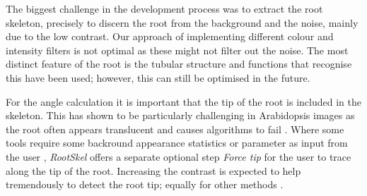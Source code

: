 The biggest challenge in the development process was to extract the root skeleton, precisely to discern the root from the background and the noise, mainly due to the low contrast. %
Our approach of implementing different colour and intensity filters is not optimal as these might not filter out the noise. 
The most distinct feature of the root is the tubular structure and functions that recognise this have been used; however, this can still be optimised in the future. 


For the angle calculation it is important that the tip of the root is included in the skeleton. This has shown to be particularly challenging in Arabidopsis images as the root often appears translucent \cite{french2009high} and causes algorithms to fail \cite{french2009high}. Where some tools require some backround appearance statistics or parameter as input from the user \cite{french2009high}, \textit{RootSkel} offers a separate optional step \textit{Force tip} for the user to trace along the tip of the root. Increasing the contrast is expected to help tremendously to detect the root tip; equally for other methods \cite{french2009high}.


